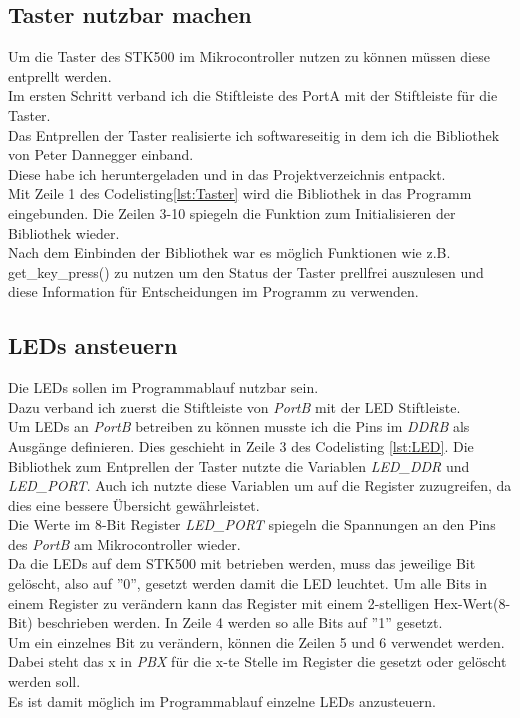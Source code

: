 \subsection{Taster nutzbar machen}
\label{sec:Taster}
Um die Taster des STK500 im Mikrocontroller nutzen zu können müssen diese entprellt werden.\\
Im ersten Schritt verband ich die Stiftleiste des PortA mit der Stiftleiste für die Taster.\\
Das Entprellen der Taster realisierte ich softwareseitig in dem ich die Bibliothek \cite{uC:Dannegger} von Peter Dannegger einband.\\
Diese habe ich heruntergeladen und in das Projektverzeichnis entpackt.\\
Mit Zeile 1 des Codelisting\ref{lst:Taster} wird die Bibliothek in das Programm eingebunden. Die Zeilen 3-10 spiegeln die Funktion zum Initialisieren der Bibliothek wieder.\\
Nach dem Einbinden der Bibliothek war es möglich Funktionen wie z.B. get\_key\_press() zu nutzen um den Status der Taster prellfrei auszulesen und diese Information für Entscheidungen im Programm zu verwenden. 

\lstset{language=C, basicstyle=\footnotesize, showstringspaces=false, tabsize=8}


\subsection{LEDs ansteuern}
\label{sec:LED}
Die LEDs sollen im Programmablauf nutzbar sein.\\
Dazu verband ich zuerst die Stiftleiste von \emph{PortB} mit der LED Stiftleiste.\\
Um LEDs an \emph{PortB} betreiben zu können musste ich die Pins im  \emph{DDRB} als Ausgänge definieren. Dies geschieht in Zeile 3 des Codelisting \ref{lst:LED}. Die Bibliothek zum Entprellen der Taster nutzte die Variablen \emph{LED\_DDR} und \emph{LED\_PORT}. Auch ich nutzte diese Variablen um auf die Register zuzugreifen, da dies eine bessere Übersicht gewährleistet.\\
Die Werte im 8-Bit Register \emph{LED\_PORT} spiegeln die Spannungen an den Pins des \emph{PortB} am Mikrocontroller wieder.\\
Da die LEDs auf dem STK500 mit  betrieben werden, muss das jeweilige Bit gelöscht, also auf ''0'', gesetzt werden damit die LED leuchtet.
Um alle Bits in einem Register zu verändern kann das Register mit einem 2-stelligen Hex-Wert(8-Bit) beschrieben werden. In Zeile 4 werden so alle Bits auf ''1'' gesetzt.\\
Um ein einzelnes Bit zu verändern, können die Zeilen 5 und 6 verwendet werden. Dabei steht das x in \emph{PBX} für die x-te Stelle im Register die gesetzt oder gelöscht werden soll.\\
Es ist damit möglich im Programmablauf einzelne LEDs anzusteuern.

